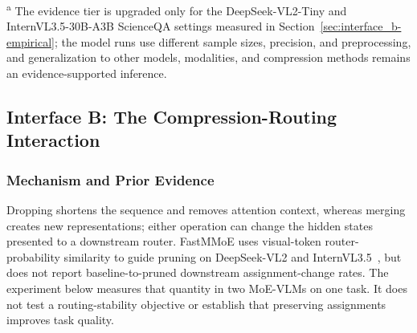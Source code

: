 \documentclass[10pt]{article}
\newenvironment{reviewchange}{\begingroup\color{red}}{\endgroup}
\begin{document}
\begin{reviewchange}
\begin{table}[t]
\parbox{0.94\linewidth}{\footnotesize\textsuperscript{a} The evidence tier is upgraded
only for the DeepSeek-VL2-Tiny and InternVL3.5-30B-A3B ScienceQA settings measured in
Section~\ref{sec:interface_b-empirical}; the model runs use different sample sizes,
precision, and preprocessing, and generalization to other models, modalities, and
compression methods remains an evidence-supported inference.}
\end{table}
\end{reviewchange}

    

\subsection{Interface B: The Compression-Routing Interaction}
\label{sec:interface_b}

\subsubsection{Mechanism and Prior Evidence}

Dropping shortens the sequence and removes attention context, whereas merging creates
new representations; either operation can change the hidden states presented to a
downstream router.  FastMMoE uses visual-token router-probability similarity to guide
pruning on DeepSeek-VL2 and InternVL3.5~\citep{xia2025fastmmoe}, but does not report
baseline-to-pruned downstream assignment-change rates.  The experiment below measures
that quantity in two MoE-VLMs on one task.  It does not test a routing-stability objective or
establish that preserving assignments improves task quality.
\end{document}
